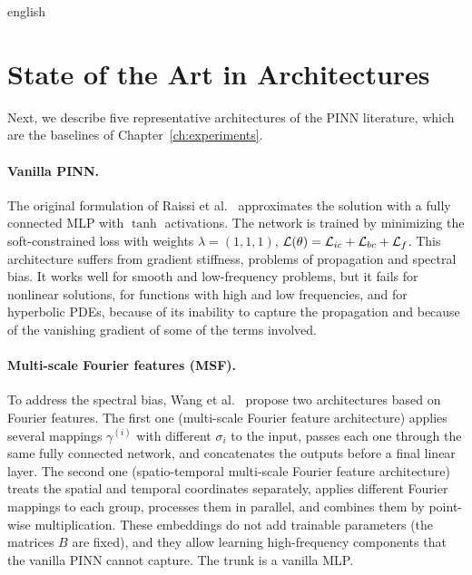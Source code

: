 \documentclass[../0000.tex]{subfiles}
\begin{document}
\begin{hyphenrules}{english}
\section{State of the Art in Architectures}\label{sec:architectures}

Next, we describe five representative architectures of the PINN literature, which are the baselines of
Chapter~\ref{ch:experiments}.

\paragraph{Vanilla PINN.}
The original formulation of Raissi et al.~\cite{raissi2019} approximates the solution with a fully connected MLP
with $\tanh$ activations. The network is trained by minimizing the soft-constrained loss with weights
$\lambda=(1,1,1)$, $\mathcal{L}(\theta)=\mathcal{L}_{ic}+\mathcal{L}_{bc}+\mathcal{L}_f$. This architecture suffers from gradient
stiffness, problems of propagation and spectral bias. It works well for smooth and low-frequency
problems, but it fails for nonlinear solutions, for functions with high and low frequencies, and for
hyperbolic PDEs, because of its inability to capture the propagation and because of the vanishing gradient
of some of the terms involved.

\paragraph{Multi-scale Fourier features (MSF).}
To address the spectral bias, Wang et al.~\cite{wang2021eigenvector} propose two architectures based on Fourier
features. The first one (multi-scale Fourier feature architecture) applies several mappings
$\gamma^{(i)}$ with different $\sigma_i$ to the input, passes each one through the same fully connected
network, and concatenates the outputs before a final linear layer. The second one (spatio-temporal
multi-scale Fourier feature architecture) treats the spatial and temporal coordinates separately, applies
different Fourier mappings to each group, processes them in parallel, and combines them by point-wise
multiplication. These embeddings do not add trainable parameters (the matrices $B$ are fixed), and they
allow learning high-frequency components that the vanilla PINN cannot capture. The trunk is a vanilla MLP.


\end{hyphenrules}
\end{document}
